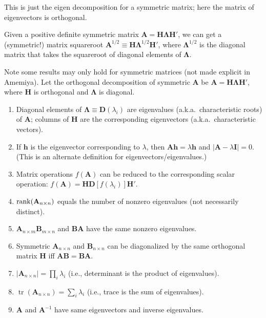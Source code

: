 \documentclass[8pt,letterpaper, landscape]{extarticle} %
\newcommand{\mA}{\ensuremath{\mathbf{A}}}
\newcommand{\mB}{\ensuremath{\mathbf{B}}}
\newcommand{\mI}{\ensuremath{\mathbf{I}}}
\begin{document}
\begin{multicols}{3}
\begin{description}
This is just the eigen decomposition for a symmetric matrix; here the matrix of eigenvectors is orthogonal.

 Given a positive definite symmetric matrix $ \mA = \mathbf{H} \mathbf{\Lambda} \mathbf{H}' $, we can get a (symmetric!) matrix squareroot $ \mA^{1/2} \equiv \mathbf{H} \mathbf{\Lambda}^{1/2} \mathbf{H}' $, where $ \mathbf{\Lambda}^{1/2} $ is the diagonal matrix that takes the squareroot of diagonal elements of $ \mathbf{\Lambda} $.

 Note some results may only hold for symmetric matrices (not made explicit in Amemiya). Let the orthogonal decomposition of symmetric $ \mA $ be $ \mA = \mathbf{H} \mathbf{\Lambda} \mathbf{H}' $, where $ \mathbf{H} $ is orthogonal and $ \mathbf{\Lambda} $ is diagonal.
\begin{enumerate}
\item Diagonal elements of $ \mathbf{\Lambda} \equiv \mathbf{D}(\lambda_i) $ are eigenvalues (a.k.a.\ characteristic roots) of $ \mA $; columns of $ \mathbf{H} $ are the corresponding eigenvectors (a.k.a.\ characteristic vectors).
\item If $ \mathbf{h} $ is the eigenvector corresponding to $ \lambda $, then $ \mA \mathbf{h} = \lambda \mathbf{h} $ and $ | \mA - \lambda \mI | = 0 $. (This is an alternate definition for eigenvectors/eigenvalues.)
\item Matrix operations $ f(\mA) $ can be reduced to the corresponding scalar operation: $ f(\mA) = \mathbf{H} \mathbf{D}[f(\lambda_i)] \mathbf{H}' $.
\item $ \rank (\mA_{n \times n}) $ equals the number of nonzero eigenvalues (not necessarily distinct).
\item $ \mA_{n \times m} \mB_{m \times n} $ and $ \mB \mA $ have the same nonzero eigenvalues.
\item Symmetric $ \mA_{n \times n} $ and $ \mB_{n \times n} $ can be diagonalized by the same orthogonal matrix $ \mathbf{H} $ iff $ \mA \mB = \mB \mA $.
\item $ | \mA_{n \times n} | = \prod_i \lambda_i $ (i.e., determinant is the product of eigenvalues).
\item $ \operatorname{tr}(\mA_{n \times n}) = \sum_i \lambda_i $ (i.e., trace is the sum of eigenvalues).
\item $ \mA $ and $ \mA^{-1} $ have same eigenvectors and inverse eigenvalues.
\end{enumerate}


\end{description}
\end{multicols}
\end{document}
